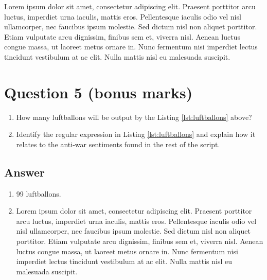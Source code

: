 \documentclass[
	12pt, %
]{../Template/fphw}
\begin{document}
Lorem ipsum dolor sit amet, consectetur adipiscing elit. Praesent porttitor arcu luctus, imperdiet urna iaculis, mattis eros. Pellentesque iaculis odio vel nisl ullamcorper, nec faucibus ipsum molestie. Sed dictum nisl non aliquet porttitor. Etiam vulputate arcu dignissim, finibus sem et, viverra nisl. Aenean luctus congue massa, ut laoreet metus ornare in. Nunc fermentum nisi imperdiet lectus tincidunt vestibulum at ac elit. Nulla mattis nisl eu malesuada suscipit.


\section*{Question 5 (bonus marks)}

\begin{problem}
	
	
	\begin{enumerate}
		\item How many luftballons will be output by the Listing \ref{lst:luftballons} above?
		\item Identify the regular expression in Listing \ref{lst:luftballons} and explain how it relates to the anti-war sentiments found in the rest of the script.
	\end{enumerate}

\end{problem}


\subsection*{Answer}

\begin{enumerate}
	\item 99 luftballons.
	\item Lorem ipsum dolor sit amet, consectetur adipiscing elit. Praesent porttitor arcu luctus, imperdiet urna iaculis, mattis eros. Pellentesque iaculis odio vel nisl ullamcorper, nec faucibus ipsum molestie. Sed dictum nisl non aliquet porttitor. Etiam vulputate arcu dignissim, finibus sem et, viverra nisl. Aenean luctus congue massa, ut laoreet metus ornare in. Nunc fermentum nisi imperdiet lectus tincidunt vestibulum at ac elit. Nulla mattis nisl eu malesuada suscipit.
\end{enumerate}

\end{document}
